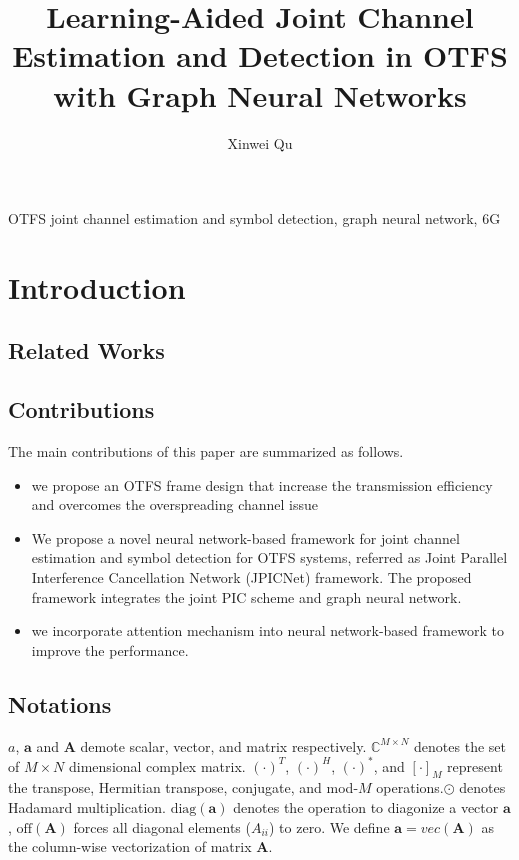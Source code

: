 \documentclass[journal]{IEEEtran}
\begin{document}
\title{Learning-Aided Joint Channel Estimation and Detection in OTFS with Graph Neural Networks}

\author{Xinwei Qu}

\maketitle

\begin{abstract}


\end{abstract}

\begin{IEEEkeywords}
OTFS joint channel estimation and symbol detection, graph neural network, 6G
\end{IEEEkeywords}

\section{Introduction}

\subsection{Related Works}

\subsection{Contributions}
The main contributions of this paper are summarized as follows.
\begin{itemize}
\item we propose an OTFS frame design that increase the transmission efficiency and overcomes the overspreading channel issue
\item We propose a novel neural network-based framework for joint channel estimation and symbol detection for OTFS systems, referred as Joint Parallel Interference Cancellation Network (JPICNet) framework. The proposed framework integrates the joint PIC scheme and graph neural network. 
\item we incorporate attention mechanism into neural network-based framework to improve the performance.
\end{itemize}

\subsection{Notations}
$a$, $\bm{a}$ and $\bm{A}$ demote scalar, vector, and matrix respectively. $\mathbb{C}^{M\times N}$ denotes the set of $M\times N$ dimensional complex matrix. $(\cdot)^T$, $(\cdot)^H$, $(\cdot)^*$, and $[\cdot]_M$ represent the transpose, Hermitian transpose, conjugate, and mod-$M$ operations.$\odot$ denotes Hadamard multiplication. $\text{diag}(\bm a)$ denotes the operation to diagonize a vector $\bm a$, $\text{off}(\bm{A})$ forces all diagonal elements ($A_{ii}$) to zero. We define $\bm{a}=vec(\bm{A})$ as the column-wise vectorization of matrix $\bm{A}$.
\end{document}
